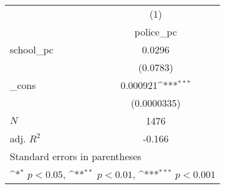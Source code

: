 {
\def\sym#1{\ifmmode^{#1}\else\(^{#1}\)\fi}
\begin{tabular}{l*{1}{c}}
\hline\hline
            &\multicolumn{1}{c}{(1)}\\
            &\multicolumn{1}{c}{police\_pc}\\
\hline
school\_pc   &      0.0296         \\
            &    (0.0783)         \\
[1em]
\_cons      &    0.000921\sym{***}\\
            & (0.0000335)         \\
\hline
\(N\)       &        1476         \\
adj. \(R^{2}\)&      -0.166         \\
\hline\hline
\multicolumn{2}{l}{\footnotesize Standard errors in parentheses}\\
\multicolumn{2}{l}{\footnotesize \sym{*} \(p<0.05\), \sym{**} \(p<0.01\), \sym{***} \(p<0.001\)}\\
\end{tabular}
}
